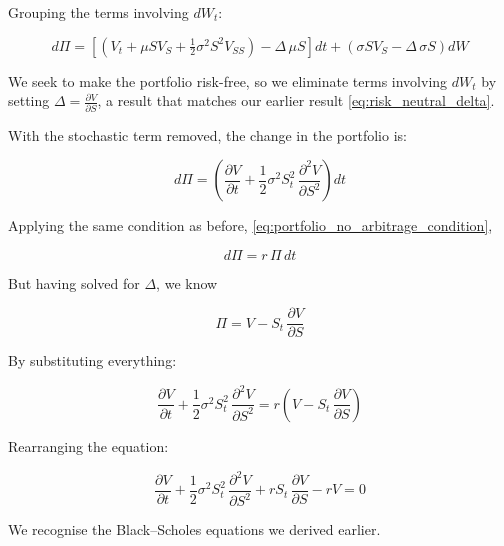 \documentclass{article}
\begin{document}
Grouping the terms involving $dW_t$:

\[
    d\Pi = \left[ \left(V_t + \mu S V_S + \tfrac{1}{2}\sigma^2 S^2 V_{SS}\right) - \Delta\,\mu S \right] dt + \left(\sigma S V_S - \Delta\,\sigma S\right) dW
\]

We seek to make the portfolio risk-free, so we eliminate terms involving $dW_t$ by setting $\Delta = \frac{\partial V}{\partial S}$, a result that matches our earlier result \cref{eq:risk_neutral_delta}.

With the stochastic term removed, the change in the portfolio is:

\[
    d\Pi = \left( \frac{\partial V}{\partial t} + \frac{1}{2}\sigma^2 S_t^2\,\frac{\partial^2 V}{\partial S^2} \right) dt
\]

Applying the same condition as before, \cref{eq:portfolio_no_arbitrage_condition}, 

\[
    d\Pi = r\,\Pi\,dt
\]

But having solved for $\Delta$, we know

\[
    \Pi = V - S_t\,\frac{\partial V}{\partial S}
\]

By substituting everything:

\[
    \frac{\partial V}{\partial t} + \frac{1}{2}\sigma^2 S_t^2\,\frac{\partial^2 V}{\partial S^2} = r\left( V - S_t\,\frac{\partial V}{\partial S} \right)
\]

Rearranging the equation:

\[
    \boxed{\frac{\partial V}{\partial t} + \frac{1}{2}\sigma^2 S_t^2\,\frac{\partial^2 V}{\partial S^2} + rS_t\,\frac{\partial V}{\partial S} - rV = 0}
\]

We recognise the Black–Scholes equations we derived earlier.

\printbibliography
\end{document}
